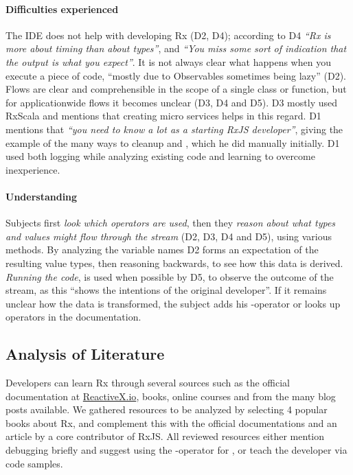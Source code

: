 \paragraph{Difficulties experienced} The IDE does not help with
developing Rx (D2, D4); according to D4 \emph{``Rx is more about timing
than about types''}, and \emph{``You miss some sort of indication that
the output is what you expect''}.  It is not always clear what happens
when you execute a piece of code, ``mostly due to Observables sometimes
being lazy'' (D2).  Flows are clear and comprehensible in the scope of a
single class or function, but for applicationwide flows it becomes
unclear (D3, D4 and D5).  D3 mostly used RxScala and mentions that
creating micro services helps in this regard.  D1 mentions that \emph{``you
need to know a lot as a starting {\lbrack}RxJS{\rbrack} developer''},
giving the example of the many ways to cleanup and ,
which he did manually initially.  D1 used both logging while analyzing
existing code and learning to overcome inexperience.

\paragraph{Understanding} Subjects first \emph{look which
operators are used}, then they \emph{reason about what types and values
might flow through the stream} (D2, D3, D4 and D5), using various
methods.  By analyzing the variable names D2 forms an expectation of the
resulting value types, then reasoning backwards, to see how this data is
derived.  \emph{Running the code}, is used when possible by D5, to
observe the outcome of the stream, as this ``shows the intentions of the
original developer''.  If it remains unclear how the data is
transformed, the subject adds his -operator or looks up
operators in the documentation.

\subsection{Analysis of Literature} Developers can learn Rx through
several sources such as the official documentation at \href{http://reactivex.io}
{ReactiveX.io}, books, online courses and from the many blog posts
available.  We gathered resources to be analyzed by selecting 4 popular
books about Rx, and complement this with the official documentations and
an article by a core contributor of RxJS.  All reviewed resources either
mention debugging briefly and suggest using the -operator for
\printfdebugging{}, or teach the developer \printfdebugging{} via code
samples.

